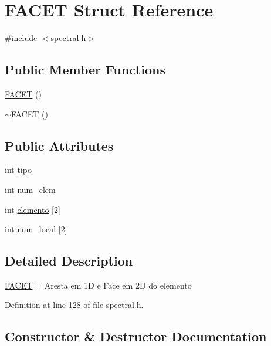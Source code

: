 \hypertarget{structFACET}{}\section{F\+A\+C\+ET Struct Reference}
\label{structFACET}


{\ttfamily \#include $<$spectral.\+h$>$}

\subsection*{Public Member Functions}
\begin{DoxyCompactItemize}
\item 
\hyperlink{structFACET_a3f08aecf5ddc76cdeb6e92345260e4c6}{F\+A\+C\+ET} ()
\item 
\hyperlink{structFACET_a2be80dc821fe7969405c8ab56e070bd4}{$\sim$\+F\+A\+C\+ET} ()
\end{DoxyCompactItemize}
\subsection*{Public Attributes}
\begin{DoxyCompactItemize}
\item 
int \hyperlink{structFACET_a381c8d10600889596aaf599d5646f18b}{tipo}
\item 
int \hyperlink{structFACET_a13c20db8879ddf701f093ac36e0235f8}{num\+\_\+elem}
\item 
int \hyperlink{structFACET_ab32efdbdcb0aa54c0a17340b2ed6bca0}{elemento} \mbox{[}2\mbox{]}
\item 
int \hyperlink{structFACET_aaa220aa7501d31db6642086cad9a9720}{num\+\_\+local} \mbox{[}2\mbox{]}
\end{DoxyCompactItemize}


\subsection{Detailed Description}
\hyperlink{structFACET}{F\+A\+C\+ET} = Aresta em 1D e Face em 2D do elemento 

Definition at line 128 of file spectral.\+h.



\subsection{Constructor \& Destructor Documentation}
\mbox{\label{structFACET_a3f08aecf5ddc76cdeb6e92345260e4c6}} 
